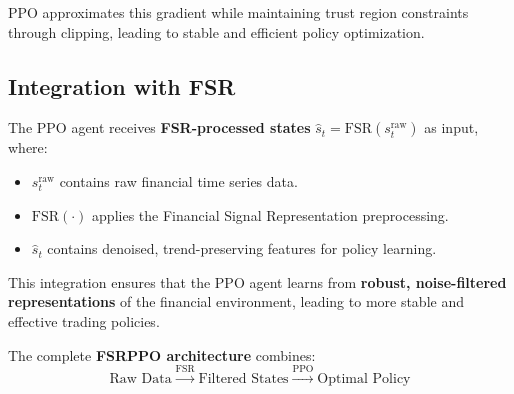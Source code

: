 \documentclass[11pt]{article}
\begin{document}
PPO approximates this gradient while maintaining trust region constraints through clipping, leading to stable and efficient policy optimization.



\subsection{Integration with FSR}
The PPO agent receives \textbf{FSR-processed states} $\hat{s}_t = \text{FSR}(s_t^{\text{raw}})$ as input, where:

\begin{itemize}
  \item $s_t^{\text{raw}}$ contains raw financial time series data.
  \item $\text{FSR}(\cdot)$ applies the Financial Signal Representation preprocessing.
  \item $\hat{s}_t$ contains denoised, trend-preserving features for policy learning.
\end{itemize}

This integration ensures that the PPO agent learns from \textbf{robust, noise-filtered representations} of the financial environment, leading to more stable and effective trading policies.

The complete \textbf{FSRPPO architecture} combines:
\[
\boxed{
\text{Raw Data} \xrightarrow{\text{FSR}} \text{Filtered States} \xrightarrow{\text{PPO}} \text{Optimal Policy}
}
\]
\end{document}
